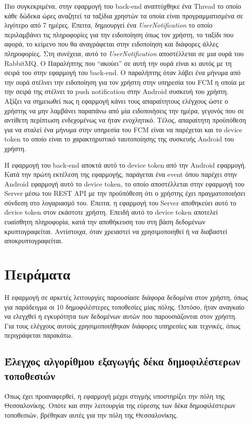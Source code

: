 \documentclass[oneside, 12pt]{book}
\begin{document}
Πιο συγκεκριμένα, στην εφαρμογή του back-end αναπτύχθηκε ένα Thread 
το οποίο κάθε δώδεκα ώρες αναζητεί τα ταξίδια χρηστών τα οποία είναι 
προγραμματισμένα σε λιγότερο από 7 ημέρες. Έπειτα, δημιουργεί ένα 
\textit{UserNotification} το οποίο περιλαμβάνει τις πληροφορίες για 
την ειδοποίηση όπως τον χρήστη, το ταξίδι που αφορά, το κείμενο που 
θα αναγράφεται στην ειδοποίηση και διάφορες άλλες πληροφορίες. Στη 
συνέχεια, αυτό το \textit{UserNotification} αποστέλλεται σε μια ουρά 
του RabbitMQ. Ο Παραλήπτης που ``ακούει'' σε αυτή την ουρά είναι κι 
αυτός με τη σειρά του στην εφαρμογή του back-end. Ο παραλήπτης όταν 
λάβει ένα μήνυμα από την ουρά στέλνει την ειδοποίηση για τον χρήστη 
στην υπηρεσία του FCM η οποία με την σειρά της στέλνει το push 
notification στην Android συσκευή του χρήστη. Αξίζει να σημειωθεί πως 
η εφαρμογή κάνει τους απαραίτητους ελέγχους ώστε ο χρήστης να μην 
λαμβάνει παραπάνω από μία ειδοποιήσεις την ημέρα, γεγονός που σε 
αντίθετη περίπτωση ενδεχομένως να ήταν ενοχλητικό. Τέλος, απαραίτητη 
προϋπόθεση για να σταλεί ένα μήνυμα στην υπηρεσία του FCM είναι να 
παρέχεται και το device token το οποίο είναι το χαρακτηριστικό 
ταυτοποίησης της συσκευής Android του χρήστη. 

Η εφαρμογή του back-end αποκτά αυτό το device token από την Android 
εφαρμογή. Κατά την πρώτη εκτέλεση της εφαρμογής, παράγεται ένα event 
όπου παρέχει στην Android εφαρμογή αυτό το device token, το οποίο 
αποστέλλεται στην εφαρμογή του Server μέσω του REST API με την 
προϋπόθεση ότι ο χρήστης έχει πραγματοποιήσει σύνδεση στο λογαριασμό 
του. Έπειτα, η εφαρμογή του Server αποθηκεύει αυτό το device token 
στον εκάστοτε χρήστη.
Επειδή αυτό το device token αποτελεί ευαίσθητη πληροφορία, κατά την 
αποθήκευση του στη βάση δεδομένων κρυπτογραφείται. Αντίστοιχα, όταν 
χρειαστεί να χρησιμοποιηθεί ή να διαβαστεί αποκρυπτογραφείται.

\chapter{Πειράματα}
Η εφαρμογή σε αρκετές λειτουργίες παρουσίασε διάφορα δεδομένα στον 
χρήστη, όπως για παράδειγμα οι 10 δημοφιλέστερες τοποθεσίες μίας 
πόλης. Ωστόσο, ήταν αναγκαίο να ελεγχθεί η εγκυρότητα των δεδομένων 
αυτών που παρουσιάζονται στον χρήστη. Για τους ελέγχους αυτούς 
χρησιμοποιήθηκαν διάφορες υπηρεσίες και τεχνικές, όπως περιγράφεται παρακάτω.

\section{Έλεγχος αλγορίθμου εξαγωγής δέκα δημοφιλέστερων τοποθεσιών}
Όπως έχει προαναφερθεί, η εφαρμογή μέχρι στιγμής υποστηρίζει την πόλη 
της Θεσσαλονίκης. Οπότε και στην λειτουργία της εύρεσης των δέκα 
δημοφιλέστερων τοποθεσιών, βρέθηκαν αυτές για την πόλη της 
Θεσσαλονίκης.
\end{document}
